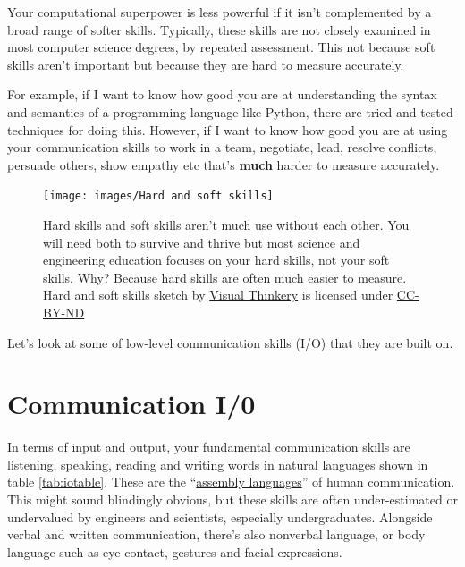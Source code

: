 \documentclass[
]{book}
\begin{document}
Your computational superpower is less powerful if it isn't complemented by a broad range of softer skills. Typically, these skills are not closely examined in most computer science degrees, by repeated assessment. This not because soft skills aren't important but because they are hard to measure accurately.

For example, if I want to know how good you are at understanding the syntax and semantics of a programming language like Python, there are tried and tested techniques for doing this. However, if I want to know how good you are at using your communication skills to work in a team, negotiate, lead, resolve conflicts, persuade others, show empathy etc that's \textbf{much} harder to measure accurately.

\begin{figure}

{\centering \texttt{[image: images/Hard and soft skills]} 

}

\caption{Hard skills and soft skills aren't much use without each other. You will need both to survive and thrive but most science and engineering education focuses on your hard skills, not your soft skills. Why? Because hard skills are often much easier to measure. Hard and soft skills sketch by \href{https://visualthinkery.com/}{Visual Thinkery} is licensed under \href{https://creativecommons.org/licenses/by-nd/4.0/}{CC-BY-ND}}\label{fig:allskills-fig}
\end{figure}



Let's look at some of low-level communication skills (I/O) that they are built on.

\hypertarget{cio}{%
\section{Communication I/0}\label{cio}}

In terms of input and output, your fundamental communication skills are listening, speaking, reading and writing words in natural languages shown in table \ref{tab:iotable}. These are the ``\href{https://en.wikipedia.org/wiki/Assembly_language}{assembly languages}'' of human communication. This might sound blindingly obvious, but these skills are often under-estimated or undervalued by engineers and scientists, especially undergraduates. Alongside verbal and written communication, there's also nonverbal language, or body language such as eye contact, gestures and facial expressions.
\end{document}
